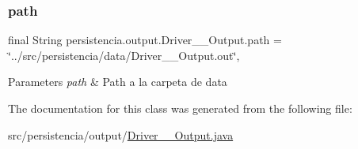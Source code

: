 \subsubsection{\texorpdfstring{path}{path}}
{\footnotesize\ttfamily final String persistencia.\+output.\+Driver\+\_\+\+\_\+\+Output.\+path = \char`\"{}../src/persistencia/data/Driver\+\_\+\+\_\+\+Output.\+out\char`\"{}\hspace{0.3cm}{\ttfamily [static]}, {\ttfamily [package]}}


\begin{DoxyParams}{Parameters}
{\em path} & Path a la carpeta de data \\
\hline
\end{DoxyParams}


The documentation for this class was generated from the following file\+:\begin{DoxyCompactItemize}
\item 
src/persistencia/output/\hyperlink{Driver____Output_8java}{Driver\+\_\+\+\_\+\+Output.\+java}\end{DoxyCompactItemize}
